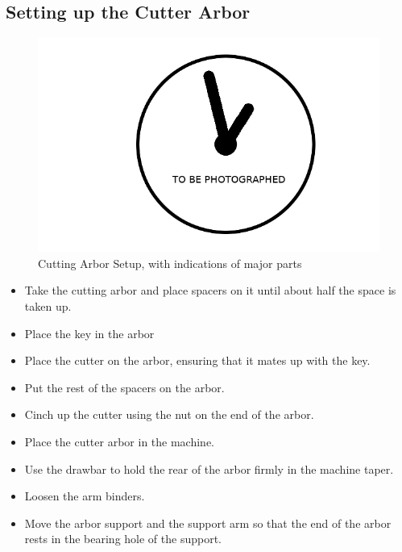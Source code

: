 \documentclass[12pt,twoside,letterpaper]{article}
\begin{document}
\subsection{Setting up the Cutter Arbor}
\begin{figure}[H]
\centering
\includegraphics[width=5in]{imgpending}
	\caption{Cutting Arbor Setup, with indications of major parts}
\end{figure}

\begin{itemize}
	\item Take the cutting arbor and place spacers on it until about half the space is taken up.
	\item Place the key in the arbor
	\item Place the cutter on the arbor, ensuring that it mates up with the key.
	\item Put the rest of the spacers on the arbor.
	\item Cinch up the cutter using the nut on the end of the arbor.
	\item Place the cutter arbor in the machine.
	\item Use the drawbar to hold the rear of the arbor firmly in the machine taper.
	\item Loosen the arm binders.
	\item Move the arbor support and the support arm so that the end of the arbor rests in the bearing hole of the support.
\end{itemize}
\end{document}
